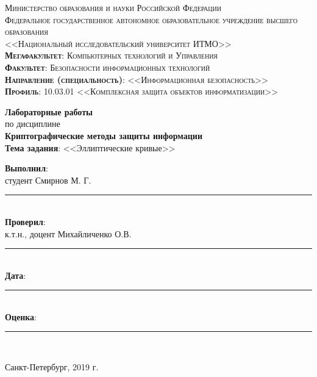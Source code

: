 \begin{titlepage}
	\begin{center}
		\textsc{
			\fontsize{12pt}{14pt}\selectfont
			Министерство образования и науки Российской Федерации\\
Федеральное государственное автономное образовательное учреждение высшего образования\\
<<Национальный исследовательский университет ИТМО>>\\
	\textbf{Мегафакультет}:  Компьютерных технологий и Управления\\
			\textbf{Факультет}: Безопасности информационных технологий\\
			\textbf{Направление (специальность)}: <<Информационная безопасность>>\\
			\textbf{Профиль}: 10.03.01 <<Комплексная защита объектов информатизации>>}
		
		\vfill
		
		\textbf{Лабораторные работы}\\
		по дисциплине\\
		\textbf{Криптографические методы защиты информации}\\
	\vfill
	\textbf{Тема задания}: <<Эллиптические кривые>>\\
	\end{center}

	\vfill
	
	\begin{flushright}
	\textbf{Выполнил}:\\ студент Смирнов М. Г. \rule{5em}{.1pt}\\
	\textbf{Проверил}:\\ к.т.н., доцент Михайличенко О.В.\rule{5em}{.1pt}\\
		\vfill
	\textbf{Дата}: \rule{10em}{.1pt}\\
	\textbf{Оценка}: \rule{10em}{.1pt}\\

	\vfill
	


	\end{flushright}
	\vfill
	\begin{center}
		Санкт-Петербург, 2019 г.
	\end{center}
\end{titlepage}